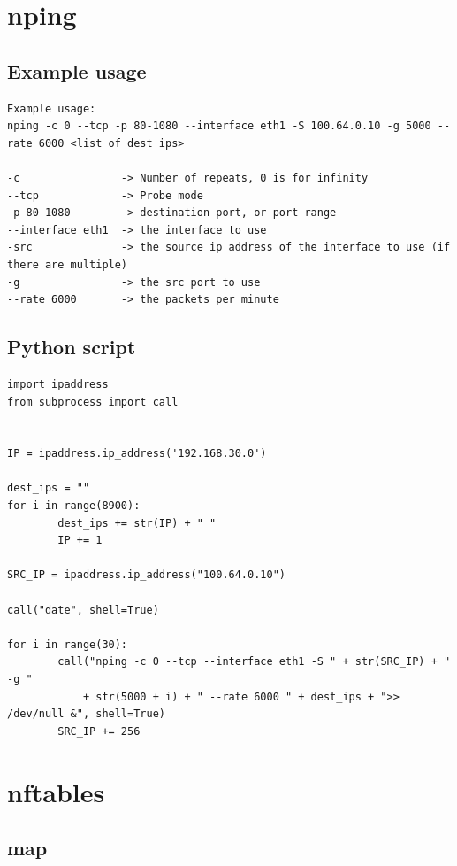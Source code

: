 \documentclass{report}
\begin{document}
\endgroup

\section{nping}\label{nping}

\subsection{Example usage}

\begingroup
\fontsize{9pt}{9pt}\selectfont
\begin{verbatim}
Example usage:
nping -c 0 --tcp -p 80-1080 --interface eth1 -S 100.64.0.10 -g 5000 --rate 6000 <list of dest ips>

-c                -> Number of repeats, 0 is for infinity
--tcp             -> Probe mode
-p 80-1080        -> destination port, or port range
--interface eth1  -> the interface to use
-src              -> the source ip address of the interface to use (if there are multiple)
-g                -> the src port to use
--rate 6000       -> the packets per minute
\end{verbatim}
\endgroup

\subsection{Python script}

\begingroup
\fontsize{9pt}{9pt}\selectfont
\begin{verbatim}
import ipaddress
from subprocess import call


IP = ipaddress.ip_address('192.168.30.0')

dest_ips = ""
for i in range(8900):
        dest_ips += str(IP) + " "
        IP += 1

SRC_IP = ipaddress.ip_address("100.64.0.10")

call("date", shell=True)

for i in range(30):
        call("nping -c 0 --tcp --interface eth1 -S " + str(SRC_IP) + " -g "
        	+ str(5000 + i) + " --rate 6000 " + dest_ips + ">> /dev/null &", shell=True)
        SRC_IP += 256
\end{verbatim}
\endgroup

\section{nftables}\label{nftables-1}

\subsection{map}
\end{document}
